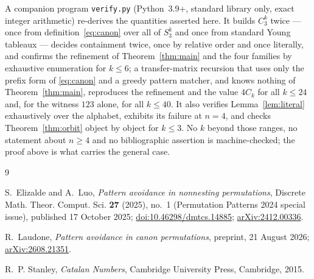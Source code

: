 \documentclass[11pt]{amsart}
\theoremstyle{definition}
\newcommand{\Cat}{C}
\begin{document}
A companion program \texttt{verify.py} (Python~3.9+, standard library only,
exact integer arithmetic) re-derives the quantities asserted here. It builds
$C_3^k$ twice --- once from definition~\eqref{eq:canon} over all of $S_3^k$ and
once from standard Young tableaux --- decides containment twice, once by
relative order and once literally, and confirms the refinement of
Theorem~\ref{thm:main} and the four families by exhaustive enumeration for
$k\le6$; a transfer-matrix recursion that uses only the prefix form of
\eqref{eq:canon} and a greedy pattern matcher, and knows nothing of
Theorem~\ref{thm:main}, reproduces the refinement and the value $4\Cat_k$ for
all $k\le24$ and, for the witness $123$ alone, for all $k\le40$. It also
verifies Lemma~\ref{lem:literal} exhaustively over the alphabet, exhibits its
failure at $n=4$, and checks Theorem~\ref{thm:orbit} object by object for
$k\le3$. No $k$ beyond those ranges, no statement about $n\ge4$ and no
bibliographic assertion is machine-checked; the proof above is what carries the
general case.

\begin{thebibliography}{9}

S.~Elizalde and A.~Luo,
\emph{Pattern avoidance in nonnesting permutations},
Discrete Math. Theor. Comput. Sci. \textbf{27} (2025), no.~1
(Permutation Patterns 2024 special issue), published 17 October 2025;
\href{https://doi.org/10.46298/dmtcs.14885}{doi:10.46298/dmtcs.14885};
\href{https://arxiv.org/abs/2412.00336}{arXiv:2412.00336}.

R.~Laudone,
\emph{Pattern avoidance in canon permutations},
preprint, 21 August 2026;
\href{https://arxiv.org/abs/2608.21351}{arXiv:2608.21351}.

R.~P. Stanley,
\emph{Catalan Numbers},
Cambridge University Press, Cambridge, 2015.

\end{thebibliography}
\end{document}
